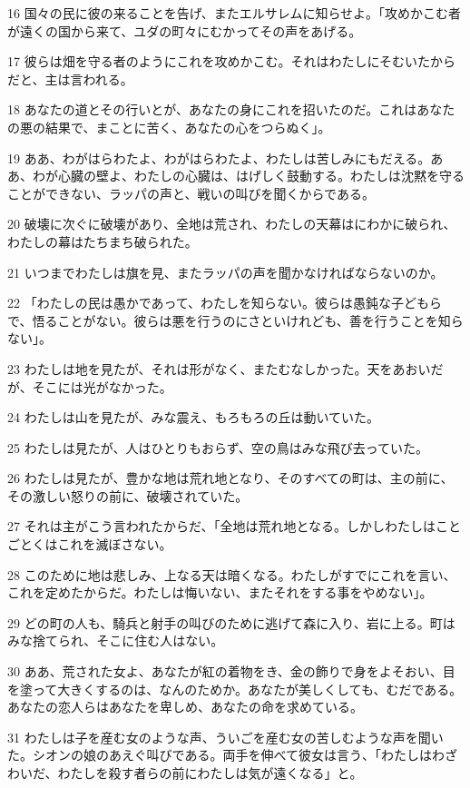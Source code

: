 \par 16 国々の民に彼の来ることを告げ、またエルサレムに知らせよ。「攻めかこむ者が遠くの国から来て、ユダの町々にむかってその声をあげる。
\par 17 彼らは畑を守る者のようにこれを攻めかこむ。それはわたしにそむいたからだと、主は言われる。
\par 18 あなたの道とその行いとが、あなたの身にこれを招いたのだ。これはあなたの悪の結果で、まことに苦く、あなたの心をつらぬく」。
\par 19 ああ、わがはらわたよ、わがはらわたよ、わたしは苦しみにもだえる。ああ、わが心臓の壁よ、わたしの心臓は、はげしく鼓動する。わたしは沈黙を守ることができない、ラッパの声と、戦いの叫びを聞くからである。
\par 20 破壊に次ぐに破壊があり、全地は荒され、わたしの天幕はにわかに破られ、わたしの幕はたちまち破られた。
\par 21 いつまでわたしは旗を見、またラッパの声を聞かなければならないのか。
\par 22 「わたしの民は愚かであって、わたしを知らない。彼らは愚鈍な子どもらで、悟ることがない。彼らは悪を行うのにさといけれども、善を行うことを知らない」。
\par 23 わたしは地を見たが、それは形がなく、またむなしかった。天をあおいだが、そこには光がなかった。
\par 24 わたしは山を見たが、みな震え、もろもろの丘は動いていた。
\par 25 わたしは見たが、人はひとりもおらず、空の鳥はみな飛び去っていた。
\par 26 わたしは見たが、豊かな地は荒れ地となり、そのすべての町は、主の前に、その激しい怒りの前に、破壊されていた。
\par 27 それは主がこう言われたからだ、「全地は荒れ地となる。しかしわたしはことごとくはこれを滅ぼさない。
\par 28 このために地は悲しみ、上なる天は暗くなる。わたしがすでにこれを言い、これを定めたからだ。わたしは悔いない、またそれをする事をやめない」。
\par 29 どの町の人も、騎兵と射手の叫びのために逃げて森に入り、岩に上る。町はみな捨てられ、そこに住む人はない。
\par 30 ああ、荒された女よ、あなたが紅の着物をき、金の飾りで身をよそおい、目を塗って大きくするのは、なんのためか。あなたが美しくしても、むだである。あなたの恋人らはあなたを卑しめ、あなたの命を求めている。
\par 31 わたしは子を産む女のような声、ういごを産む女の苦しむような声を聞いた。シオンの娘のあえぐ叫びである。両手を伸べて彼女は言う、「わたしはわざわいだ、わたしを殺す者らの前にわたしは気が遠くなる」と。

